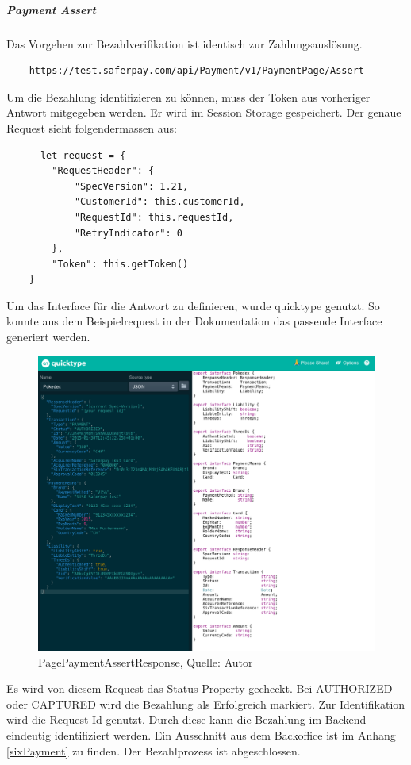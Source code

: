 \subparagraph{Payment Assert}
Das Vorgehen zur Bezahlverifikation ist  identisch zur Zahlungsauslösung. 
\begin{verbatim}
	https://test.saferpay.com/api/Payment/v1/PaymentPage/Assert
\end{verbatim}
Um die Bezahlung identifizieren zu können, muss der Token aus vorheriger Antwort mitgegeben werden. Er wird im Session Storage gespeichert. 
Der genaue Request sieht folgendermassen aus: 
\begin{verbatim}
	  let request = {
		"RequestHeader": {
			"SpecVersion": 1.21,
			"CustomerId": this.customerId,
			"RequestId": this.requestId,
			"RetryIndicator": 0
		},
		"Token": this.getToken()
	}
\end{verbatim}
Um das Interface für die Antwort zu definieren, wurde quicktype genutzt. So konnte aus dem Beispielrequest in der Dokumentation das passende Interface generiert werden. 
\begin{figure}[H]
	\centering
	\includegraphics[width=1\textwidth]{images/quickType.PNG}
	\caption[PagePaymentAssertResponse]{PagePaymentAssertResponse, Quelle: Autor}
	\label{img: PagePaymentAssertResponse}
\end{figure} 

Es wird von diesem Request das Status-Property gecheckt. Bei \glqq AUTHORIZED\grqq{} oder \glqq CAPTURED\grqq{} wird die Bezahlung als Erfolgreich markiert. 
Zur Identifikation wird die Request-Id genutzt. Durch diese kann die Bezahlung im Backend eindeutig identifiziert werden. Ein Ausschnitt aus dem Backoffice ist im Anhang \ref{sixPayment} zu finden. 
Der Bezahlprozess ist abgeschlossen. 
\newpage
